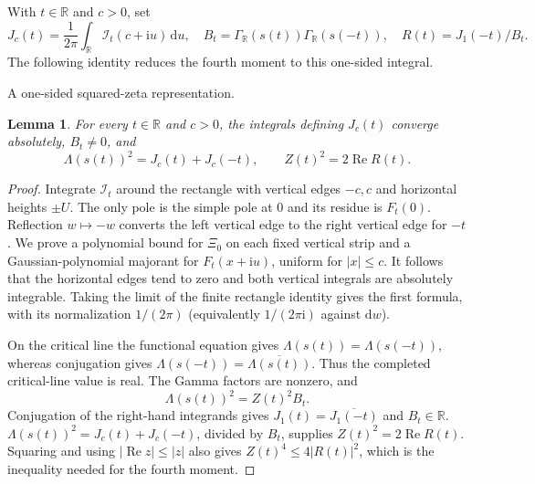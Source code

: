 \documentclass[11pt,a4paper]{article}
\numberwithin{equation}{section}
\newtheorem{lemma}[theorem]{Lemma}
\theoremstyle{definition}
\newcommand{\R}{\mathbb R}
\newcommand{\dd}{\,\mathrm d}
\newcommand{\ii}{\mathrm i}
\newcommand{\Rea}{\operatorname{Re}}
\newcommand{\zabs}{Z}
\begin{document}
With $t\in\R$ and $c>0$, set
\[
 J_c(t)=\frac1{2\pi}\int_{\R}\mathscr I_t(c+\ii u)\dd u,\quad
 B_t=\Gamma_{\R}(s(t))\Gamma_{\R}(s(-t)),\quad R(t)=J_1(-t)/B_t.
\]
The following identity reduces the fourth moment to this one-sided integral.
\par\medskip\noindent A one-sided squared-zeta representation.
\begin{lemma}\label{lem:squaresource}
For every $t\in\R$ and $c>0$, the integrals defining $J_c(t)$ converge
absolutely, $B_t\ne0$, and
\[
 \Lambda(s(t))^2=J_c(t)+J_c(-t),\qquad Z(t)^2=2\Rea R(t).
\]
\end{lemma}
\begin{proof}
Integrate $\mathscr I_t$ around the rectangle with vertical edges $-c,c$ and
horizontal heights $\pm U$. The only pole is the simple pole at $0$ and its
residue is $F_t(0)$. Reflection $w\mapsto-w$ converts the left vertical
edge to the right vertical edge for $-t$. We prove a polynomial
bound for $\Xi_0$ on each fixed vertical strip and a Gaussian-polynomial
majorant for $F_t(x+\ii u)$, uniform for $|x|\le c$. It follows that the
horizontal edges tend to zero and both vertical integrals are absolutely
integrable. Taking the limit of the finite rectangle identity gives the first
formula, with its normalization $1/(2\pi)$ (equivalently $1/(2\pi\ii)$
against $\mathrm dw$).

On the critical line the functional equation gives
$\Lambda(s(t))=\Lambda(s(-t))$, whereas conjugation gives
$\Lambda(s(-t))=\overline{\Lambda(s(t))}$. Thus the completed critical-line
value is real. The Gamma factors are nonzero, and
\[
 \Lambda(s(t))^2=\zabs(t)^2B_t.
\]
Conjugation of the right-hand integrands gives $J_1(t)=\overline{J_1(-t)}$
and $B_t\in\R$. $\Lambda(s(t))^2=J_c(t)+J_c(-t)$, divided by $B_t$, supplies
$\zabs(t)^2=2\Rea R(t)$. Squaring and using $|\Rea z|\le|z|$ also gives
$Z(t)^4\le4|R(t)|^2$, which is the inequality needed for the fourth moment.
\end{proof}
\end{document}
